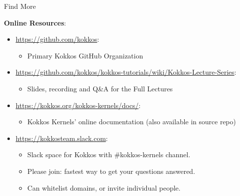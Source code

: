 \begin{frame}{Find More}

  \textbf{Online Resources}:

  \begin{itemize}
    \item \url{https://github.com/kokkos}:
          \begin{itemize}
            \item Primary Kokkos GitHub Organization
          \end{itemize}
    \item \url{https://github.com/kokkos/kokkos-tutorials/wiki/Kokkos-Lecture-Series}:
          \begin{itemize}
            \item{Slides, recording and Q\&A for the Full Lectures}
          \end{itemize}
    \item \url{https://kokkos.org/kokkos-kernels/docs/}:
          \begin{itemize}
            \item Kokkos Kernels' online documentation (also available in source repo)
          \end{itemize}
    \item \url{https://kokkosteam.slack.com}:
          \begin{itemize}
            \item Slack space for Kokkos with {\ttfamily \#kokkos-kernels} channel.
            \item Please join: fastest way to get your questions answered.
            \item Can whitelist domains, or invite individual people.
          \end{itemize}
  \end{itemize}

\end{frame}







